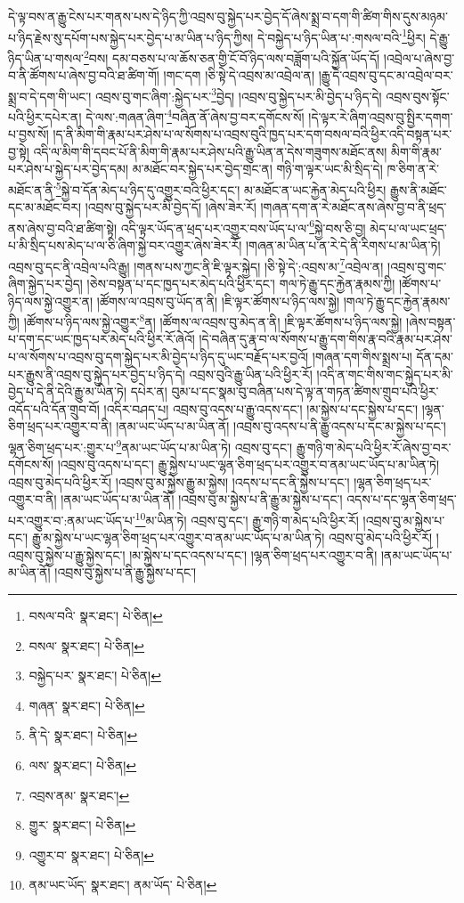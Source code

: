 དེ་ལྟ་བས་ན་རྒྱུ་ངེས་པར་གནས་པས་དེ་ཉིད་ཀྱི་འབྲས་བུ་སྐྱེད་པར་བྱེད་དོ་ཞེས་སྨྲ་བ་དག་གི་ཚིག་གིས་དུས་མཉམ་པ་ཉིད་རྗེས་སུ་དཔོག་པས་སྐྱེད་པར་བྱེད་པ་མ་ཡིན་པ་ཉིད་ཀྱིས། དེ་བསྐྱེད་པ་ཉིད་ཡིན་པ་:གསལ་བའི་\footnote{བསལ་བའི་  སྣར་ཐང་།  པེ་ཅིན། }ཕྱིར། དེ་རྒྱུ་ཉིད་ཡིན་པ་གསལ་\footnote{བསལ་  སྣར་ཐང་།  པེ་ཅིན། }བས། དམ་བཅས་པ་ལ་ཆོས་ཅན་གྱི་ངོ་བོ་ཉིད་ལས་བཟློག་པའི་སྐྱོན་ཡོད་དོ། །འབྲེལ་པ་ཞེས་བྱ་བ་ནི་ཚོགས་པ་ཞེས་བྱ་བའི་ཐ་ཚིག་གོ། །གང་དག །ཅི་སྟེ་དེ་འབྲས་མ་འབྲེལ་ན། །རྒྱུ་དེ་འབྲས་བུ་དང་མ་འབྲེལ་བར་སྨྲ་བ་དེ་དག་གི་ཡང་། འབྲས་བུ་གང་ཞིག་:སྐྱེད་པར་\footnote{བསྐྱེད་པར་  སྣར་ཐང་།  པེ་ཅིན། }བྱེད། །འབྲས་བུ་སྐྱེད་པར་མི་བྱེད་པ་ཉིད་དེ། འབྲས་བུས་སྟོང་པའི་ཕྱིར་དཔེར་ན། དེ་ལས་:གཞན་ཞིག་\footnote{གཞན་  སྣར་ཐང་།  པེ་ཅིན། }བཞིན་ནོ་ཞེས་བྱ་བར་དགོངས་སོ། །དེ་ལྟར་རེ་ཞིག་འབྲས་བུ་སྤྱིར་དགག་པ་བྱས་སོ། །ད་ནི་མིག་གི་རྣམ་པར་ཤེས་པ་ལ་སོགས་པ་འབྲས་བུའི་ཁྱད་པར་དག་བསལ་བའི་ཕྱིར་འདི་བསྟན་པར་བྱ་སྟེ། འདི་ལ་མིག་གི་དབང་པོ་ནི་མིག་གི་རྣམ་པར་ཤེས་པའི་རྒྱུ་ཡིན་ན་དེས་གཟུགས་མཐོང་ནས། མིག་གི་རྣམ་པར་ཤེས་པ་སྐྱེད་པར་བྱེད་དམ། མ་མཐོང་བར་སྐྱེད་པར་བྱེད་གྲང་ན། གཉི་ག་ལྟར་ཡང་མི་སྲིད་དེ། ཁ་ཅིག་ན་རེ་མཐོང་ན་ནི་\footnote{ནི་དེ་  སྣར་ཐང་།  པེ་ཅིན། }སྐྱེ་བ་དོན་མེད་པ་ཉིད་དུ་འགྱུར་བའི་ཕྱིར་དང་། མ་མཐོང་ན་ཡང་རྐྱེན་མེད་པའི་ཕྱིར། རྒྱུས་ནི་མཐོང་དང་མ་མཐོང་བར། །འབྲས་བུ་སྐྱེད་པར་མི་བྱེད་དོ། །ཞེས་ཟེར་རོ། །གཞན་དག་ན་རེ་མཐོང་ནས་ཞེས་བྱ་བ་ནི་ཕྲད་ནས་ཞེས་བྱ་བའི་ཐ་ཚིག་སྟེ། འདི་ལྟར་ཡོད་ན་ཕྲད་པར་འགྱུར་བས་ཡོད་པ་ལ་\footnote{ལས་  སྣར་ཐང་།  པེ་ཅིན། }སྐྱེ་བས་ཅི་བྱ། མེད་པ་ལ་ཡང་ཕྲད་པ་མི་སྲིད་པས་མེད་པ་ལ་ཅི་ཞིག་སྐྱེ་བར་འགྱུར་ཞེས་ཟེར་རོ། །གཞན་མ་ཡིན་པ་ན་རེ་དེ་ནི་རིགས་པ་མ་ཡིན་ཏེ། འབྲས་བུ་དང་ནི་འབྲེལ་པའི་རྒྱུ། །གནས་པས་ཀྱང་ནི་ཇི་ལྟར་སྐྱེད། །ཅི་སྟེ་དེ་:འབྲས་མ་\footnote{འབྲས་ནམ་  སྣར་ཐང་། }འབྲེལ་ན། །འབྲས་བུ་གང་ཞིག་སྐྱེད་པར་བྱེད། །ཅེས་བསྟན་པ་དང་ཁྱད་པར་མེད་པའི་ཕྱིར་དང་། གལ་ཏེ་རྒྱུ་དང་རྐྱེན་རྣམས་ཀྱི། །ཚོགས་པ་ཉིད་ལས་སྐྱེ་འགྱུར་ན། །ཚོགས་ལ་འབྲས་བུ་ཡོད་ན་ནི། །ཇི་ལྟར་ཚོགས་པ་ཉིད་ལས་སྐྱེ། །གལ་ཏེ་རྒྱུ་དང་རྐྱེན་རྣམས་ཀྱི། །ཚོགས་པ་ཉིད་ལས་སྐྱེ་འགྱུར་\footnote{གྱུར་  སྣར་ཐང་།  པེ་ཅིན། }ན། །ཚོགས་ལ་འབྲས་བུ་མེད་ན་ནི། །ཇི་ལྟར་ཚོགས་པ་ཉིད་ལས་སྐྱེ། །ཞེས་བསྟན་པ་དག་དང་ཡང་ཁྱད་པར་མེད་པའི་ཕྱིར་རོ་ཞེའོ། །དེ་བཞིན་དུ་རྣ་བ་ལ་སོགས་པ་རྒྱུ་དག་གིས་རྣ་བའི་རྣམ་པར་ཤེས་པ་ལ་སོགས་པ་འབྲས་བུ་དག་སྐྱེད་པར་མི་བྱེད་པ་ཉིད་དུ་ཡང་བརྗོད་པར་བྱའོ། །གཞན་དག་གིས་སྨྲས་པ། དོན་དམ་པར་རྒྱུས་ནི་འབྲས་བུ་སྐྱེད་པར་བྱེད་པ་ཉིད་དེ། འབྲས་བུའི་རྒྱུ་ཡིན་པའི་ཕྱིར་རོ། །འདི་ན་གང་གིས་གང་སྐྱེད་པར་མི་བྱེད་པ་དེ་ནི་དེའི་རྒྱུ་མ་ཡིན་ཏེ། དཔེར་ན། བུམ་པ་དང་སྣམ་བུ་བཞིན་པས་དེ་ལྟ་ན་གཏན་ཚིགས་གྲུབ་པའི་ཕྱིར་འདོད་པའི་དོན་གྲུབ་བོ། །འདིར་བཤད་པ། འབྲས་བུ་འདས་པ་རྒྱུ་འདས་དང་། །མ་སྐྱེས་པ་དང་སྐྱེས་པ་དང་། །ལྷན་ཅིག་ཕྲད་པར་འགྱུར་བ་ནི། །ནམ་ཡང་ཡོད་པ་མ་ཡིན་ནོ། །འབྲས་བུ་འདས་པ་ནི་རྒྱུ་འདས་པ་དང་མ་སྐྱེས་པ་དང་། ལྷན་ཅིག་ཕྲད་པར་:གྱུར་པ་\footnote{འགྱུར་བ་  སྣར་ཐང་།  པེ་ཅིན། }ནམ་ཡང་ཡོད་པ་མ་ཡིན་ཏེ། འབྲས་བུ་དང་། རྒྱུ་གཉི་ག་མེད་པའི་ཕྱིར་རོ་ཞེས་བྱ་བར་དགོངས་སོ། །འབྲས་བུ་འདས་པ་དང་། རྒྱུ་སྐྱེས་པ་ཡང་ལྷན་ཅིག་ཕྲད་པར་འགྱུར་བ་ནམ་ཡང་ཡོད་པ་མ་ཡིན་ཏེ། འབྲས་བུ་མེད་པའི་ཕྱིར་རོ། །འབྲས་བུ་མ་སྐྱེས་རྒྱུ་མ་སྐྱེས། །འདས་པ་དང་ནི་སྐྱེས་པ་དང་། །ལྷན་ཅིག་ཕྲད་པར་འགྱུར་བ་ནི། །ནམ་ཡང་ཡོད་པ་མ་ཡིན་ནོ། །འབྲས་བུ་མ་སྐྱེས་པ་ནི་རྒྱུ་མ་སྐྱེས་པ་དང་། འདས་པ་དང་ལྷན་ཅིག་ཕྲད་པར་འགྱུར་བ་:ནམ་ཡང་ཡོད་པ་\footnote{ནམ་ཡང་ཡོད་  སྣར་ཐང་། ནམ་ཡོད་  པེ་ཅིན། }མ་ཡིན་ཏེ། འབྲས་བུ་དང་། རྒྱུ་གཉི་ག་མེད་པའི་ཕྱིར་རོ། །འབྲས་བུ་མ་སྐྱེས་པ་དང་། རྒྱུ་མ་སྐྱེས་པ་ཡང་ལྷན་ཅིག་ཕྲད་པར་འགྱུར་བ་ནམ་ཡང་ཡོད་པ་མ་ཡིན་ཏེ། འབྲས་བུ་མེད་པའི་ཕྱིར་རོ། །འབྲས་བུ་སྐྱེས་པ་རྒྱུ་སྐྱེས་དང་། །མ་སྐྱེས་པ་དང་འདས་པ་དང་། །ལྷན་ཅིག་ཕྲད་པར་འགྱུར་བ་ནི། །ནམ་ཡང་ཡོད་པ་མ་ཡིན་ནོ། །འབྲས་བུ་སྐྱེས་པ་ནི་རྒྱུ་སྐྱེས་པ་དང་། 